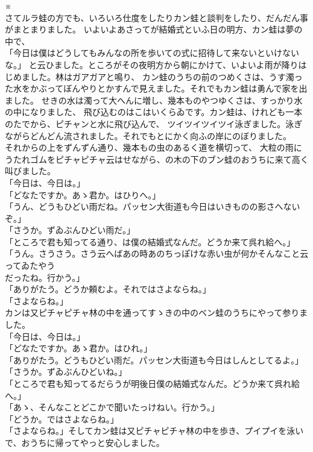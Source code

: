 \documentclass[
a4paper,
10pt,
book]
{tarticle}
\begin{document}
\newpage
\setcounter{page}{14}
\thispagestyle{fancy}
\indent \indent \indent \indent \indent \indent \indent \indent \indent \indent ※\\

\indent さてルラ蛙の方でも、いろいろ仕度をしたりカン蛙と談判をしたり、だんだん事がまとまりました。
いよいよあさってが結婚式といふ日の明方、カン蛙は夢の中で、\\
「今日は僕はどうしてもみんなの所を歩いての式に招待して来ないといけないな。」
と云ひました。ところがその夜明方から朝にかけて、いよいよ雨が降りはじめました。林はガアガアと鳴り、
カン蛙のうちの前のつめくさは、うす濁った水をかぶってぼんやりとかすんで見えました。それでもカン蛙は勇んで家を出ました。
せきの水は濁って大へんに増し、幾本ものやつゆくさは、すっかり水の中になりました、
飛び込むのはこはいくらゐです。カン蛙は、けれども一本のたでから、ピチャンと水に飛び込んで、
ツイツイツイツイ泳ぎました。泳ぎながらどんどん流されました。それでもとにかく向ふの岸にのぼりました。\\
\indent それからの上をずんずん通り、幾本もの虫のあるく道を横切って、
大粒の雨にうたれゴムをピチャピチャ云はせながら、の木の下のブン蛙のおうちに来て高く叫びました。\\
「今日は、今日は。」\\
「どなたですか。あゝ君か。はひりへ。」\\
「うん、どうもひどい雨だね。パッセン大街道も今日はいきものの影さへないぞ。」\\
「さうか。ずゐぶんひどい雨だ。」\\
「ところで君も知ってる通り、は僕の結婚式なんだ。どうか来て呉れ給へ。」\\
「うん。さうさう。さう云へばあの時あのちっぽけな赤い虫が何かそんなこと云ってゐたやう\\
\indent だったね。行かう。」\\
「ありがたう。どうか頼むよ。それではさよならね。」\\
「さよならね。」\\
\indent カンは又ピチャピチャ林の中を通ってすゝきの中のベン蛙のうちにやって参りました。\\
「今日は、今日は。」\\
「どなたですか。あゝ君か。はひれ。」\\
「ありがたう。どうもひどい雨だ。パッセン大街道も今日はしんとしてるよ。」\\
「さうか。ずゐぶんひどいね。」\\
「ところで君も知ってるだらうが明後日僕の結婚式なんだ。どうか来て呉れ給へ。」\\
「あゝ、そんなことどこかで聞いたっけねい。行かう。」\\
「どうか。ではさよならね。」\\
「さよならね。」そしてカン蛙は又ピチャピチャ林の中を歩き、プイプイを泳いで、おうちに帰ってやっと安心しました。\\
\end{document}
